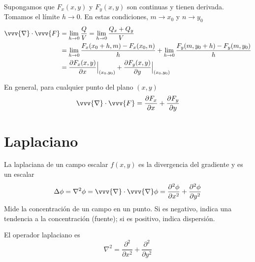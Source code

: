 Supongamos que $F_x(x,y)$ y $F_y(x,y)$ son continuas y tienen derivada.
Tomamos el límite $h\to 0$. En estas condiciones, $m\to x_0$ y $n\to y_0$
\begin{align*}
  \vvv{\nabla}\cdot\vvv{F}
  &= \lim_{h\to 0}\dfrac{Q}{V}
  = \lim_{h\to 0}\dfrac{Q_x + Q_y}{V}\\
  &= \lim_{h\to 0}\dfrac{F_x(x_0+h, m) - F_x(x_0, n)}{h}
  + \lim_{h\to 0}\dfrac{F_y(m, y_0+h) - F_y(m, y_0)}{h} \\
  &= \dfrac{\partial F_x(x,y)}{\partial x}\Big|_{(x_0,y_0)}
    + \dfrac{\partial F_y(x,y)}{\partial y}\Big|_{(x_0,y_0)}
\end{align*}

En general, para cualquier punto del plano $(x,y)$
\[
  \vvv{\nabla}\cdot\vvv{F}
  = \dfrac{\partial F_x}{\partial x} + \dfrac{\partial F_y}{\partial y}
\]

\section{Laplaciano}
La laplaciana de un campo escalar $f(x,y)$ es la divergencia del gradiente y es un
escalar
\begin{equation}\label{eq:R2-gradiente-cartesianas}
  \Delta \phi
  = \nabla^2 \phi
  = \vvv{\nabla}\cdot\vvv{\nabla}\phi
  = \dfrac{\partial^2 \phi}{\partial x^2}
  + \dfrac{\partial^2 \phi}{\partial y^2}
\end{equation}
Mide la concentración de un campo en un punto. Si es negativo, indica una tendencia a la
concentración (fuente); si es positivo, indica dispersión.

El operador laplaciano es
\begin{equation}
  \nabla^2
  = \dfrac{\partial^2}{\partial x^2}
  + \dfrac{\partial^2}{\partial y^2}
\end{equation}

